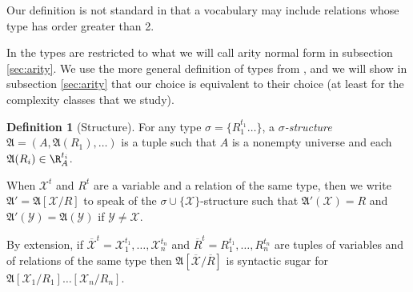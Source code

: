 \documentclass[a4paper,12pt]{article}
\newcommand{\emphdex}[1]{\index{#1}\emph{#1}}
\theoremstyle{definition}
\newtheorem{definition}[theorem]{Definition}
\newcommand{\mc}{\mathcal}
\newcommand{\mf}{\mathfrak}
\newcommand{\ol}{\overline}
\newcommand{\olmc}[1]{\overline{\mathcal{#1}}}
\begin{document}
Our definition is not standard in that a vocabulary may include
relations whose type has order greater than 2.

In \cite{lauri} the types are restricted to what we will call arity
normal form in subsection \ref{sec:arity}. We use the more general
definition of types from \cite{arity}, and we will show in subsection
\ref{sec:arity} that our choice is equivalent to their choice (at
least for the complexity classes that we study).
\begin{definition}[Structure]
\label{structure}
For any type $\sigma = \{R_1^{t_1} \ldots\}$, a \emphdex{$\sigma$-structure }$\mf A = (A,
\mf A(R_1), \ldots )$ is a tuple such that $A$ is a nonempty universe and
each $\mf A(R_i) \in \R^{t_{i}}_{A}$.



When $\mc X^{t}$ and $ R^{t}$ are a variable and a relation of the same
type, then we write $\mathfrak A'=\mathfrak A[\mathcal X/R]$ to speak
of the $\sigma\cup\{\mathcal X\}$-structure such that $\mathfrak
A'(\mathcal X)=R$ and $\mathfrak A'(\mathcal Y)=\mathfrak A(\mathcal
Y)$ if $\mathcal Y\not=\mathcal X$.

By extension, if $\olmc X^{t}=\mc X_{1}^{t_{1}},\dots,\mc
X_{n}^{t_{n}}$ and $\ol R^{t}= R_{1}^{t_{1}},\dots, R_{n}^{t_{n}}$ are
tuples of variables and of relations of the same type then $\mathfrak
A[\olmc X/\ol R]$ is syntactic sugar for $\mathfrak A[\mc X_{1}/
R_{1}]\dots[\mc X_{n}/R_{n}]$.
\end{definition}
\end{document}
